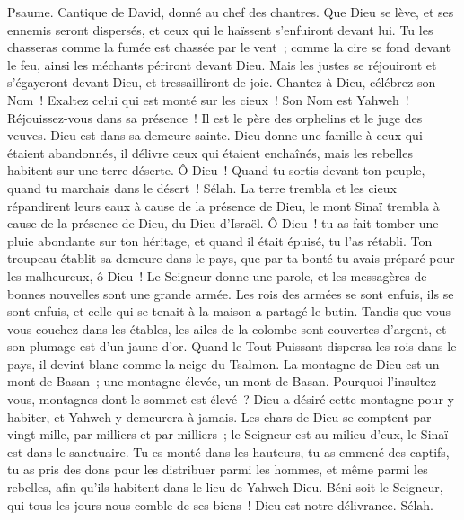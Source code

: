 \begin{multicols}{2}
\VerseOne{}Psaume. Cantique de David, donné au chef des chantres.
Que Dieu se lève, et ses ennemis seront dispersés, et ceux qui le haïssent s'enfuiront devant lui.
Tu les chasseras comme la fumée est chassée par le vent~; comme la cire se fond devant le feu, ainsi les méchants périront devant Dieu.
Mais les justes se réjouiront et s'égayeront devant Dieu, et tressailliront de joie.
Chantez à Dieu, célébrez son Nom~! Exaltez celui qui est monté sur les cieux~! Son Nom est Yahweh~! Réjouissez-vous dans sa présence~!
Il est le père des orphelins et le juge des veuves. Dieu est dans sa demeure sainte.
Dieu donne une famille à ceux qui étaient abandonnés, il délivre ceux qui étaient enchaînés, mais les rebelles habitent sur une terre déserte.
Ô Dieu~! Quand tu sortis devant ton peuple, quand tu marchais dans le désert~! Sélah.
La terre trembla et les cieux répandirent leurs eaux à cause de la présence de Dieu, le mont Sinaï trembla à cause de la présence de Dieu, du Dieu d'Israël.
Ô Dieu~! tu as fait tomber une pluie abondante sur ton héritage, et quand il était épuisé, tu l'as rétabli.
Ton troupeau établit sa demeure dans le pays, que par ta bonté tu avais préparé pour les malheureux, ô Dieu~!
Le Seigneur donne une parole, et les messagères de bonnes nouvelles sont une grande armée.
Les rois des armées se sont enfuis, ils se sont enfuis, et celle qui se tenait à la maison a partagé le butin.
Tandis que vous vous couchez dans les étables, les ailes de la colombe sont couvertes d'argent, et son plumage est d'un jaune d'or.
Quand le Tout-Puissant dispersa les rois dans le pays, il devint blanc comme la neige du Tsalmon.
La montagne de Dieu est un mont de Basan~; une montagne élevée, un mont de Basan.
Pourquoi l'insultez-vous, montagnes dont le sommet est élevé~? Dieu a désiré cette montagne pour y habiter, et Yahweh y demeurera à jamais.
Les chars de Dieu se comptent par vingt-mille, par milliers et par milliers~; le Seigneur est au milieu d'eux, le Sinaï est dans le sanctuaire.
Tu es monté dans les hauteurs, tu as emmené des captifs, tu as pris des dons pour les distribuer parmi les hommes, et même parmi les rebelles, afin qu'ils habitent dans le lieu de Yahweh Dieu.
Béni soit le Seigneur, qui tous les jours nous comble de ses biens~! Dieu est notre délivrance. Sélah.

\end{multicols}
